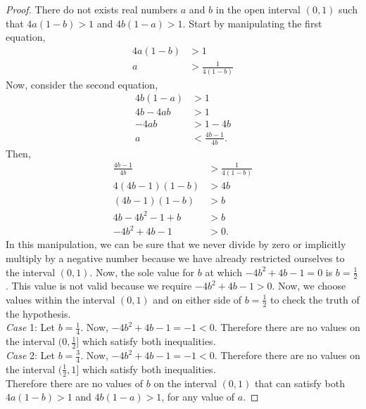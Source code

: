 \documentclass[12pt]{article}
\begin{document}
    \begin{proof}{There do not exists real numbers \(a\) and \(b\) in the open interval \((0,1)\) such that \(4a(1-b)>1\) and \(4b(1-a)>1\).}
        Start by manipulating the first equation,  
        \begin{equation*}
            \begin{split}
                4a(1-b) &> 1\\
                a&>\frac{1}{4(1-b)}
            \end{split}
        \end{equation*}
        Now, consider the second equation, 
        \begin{equation*}
            \begin{split}
                4b(1-a) &> 1\\
                4b-4ab &> 1\\
                -4ab &> 1-4b\\
                a &< \frac{4b-1}{4b}.
            \end{split}
        \end{equation*}
        Then,
        \begin{equation*}
            \begin{split}
                \frac{4b-1}{4b} &> \frac{1}{4(1-b)}\\
                4(4b-1)(1-b) &> 4b\\
                (4b-1)(1-b) &> b\\
                4b-4b^2-1+b &> b\\
                -4b^2+4b-1 &> 0.
            \end{split}
        \end{equation*}
        In this manipulation, we can be sure that we never divide by zero or implicitly multiply by a negative number because we have already restricted ourselves to the interval \((0,1)\). Now, the sole value for \(b\) at which \(-4b^2+4b-1 = 0\) is \(b=\frac{1}{2}\). This value is not valid because we require \(-4b^2+4b-1>0\). Now, we choose values within the interval \((0,1)\) and on either side of \(b=\frac{1}{2}\) to check the truth of the hypothesis. \\
        \textit{Case} 1: Let \(b=\frac{1}{4}\). Now, \(-4b^2+4b-1=-1<0\). Therefore there are no values on the interval \((0,\frac{1}{2}]\) which satisfy both inequalities.\\
        \textit{Case} 2: Let \(b=\frac{3}{4}\). Now, \(-4b^2+4b-1=-1<0\). Therefore there are no values on the interval \((\frac{1}{2},1]\) which satisfy both inequalities.\\
        Therefore there are no values of \(b\) on the interval \((0,1)\) that can satisfy both \(4a(1-b)>1\) and \(4b(1-a)>1\), for any value of \(a\).
    \end{proof}
\end{document}

